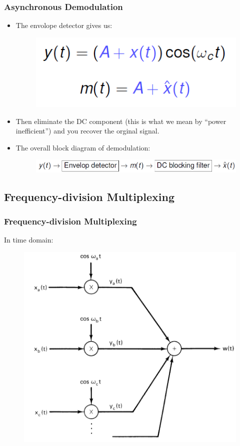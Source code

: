 \documentclass{beamer}
\begin{document}
\begin{frame}
\frametitle{Asynchronous Demodulation}
\begin{itemize}
\item The envolope detector gives us:
\begin{figure}
\includegraphics[width=0.4\linewidth]{asyn6}
\end{figure}
\item Then eliminate the DC component (this is what we mean by ``power inefficient'') and you recover the orginal signal.
\item The overall block diagram of demodulation:
\begin{figure}
\includegraphics[width=0.8\linewidth]{asyn5}
\end{figure}
\end{itemize}
\end{frame}

\subsection{Frequency-division Multiplexing}
\begin{frame}
\frametitle{Frequency-division Multiplexing}
In time domain:
\begin{figure}
\includegraphics[width=0.6\linewidth]{multi1}
\end{figure}
\end{frame}
\end{document}
